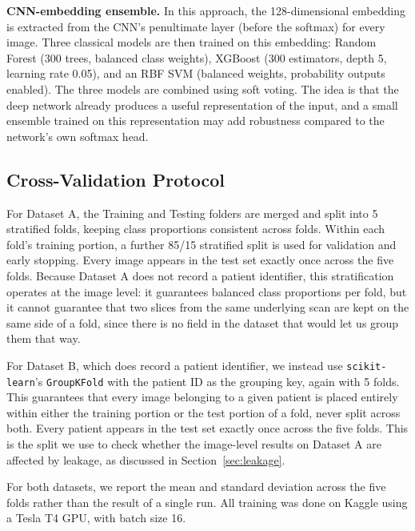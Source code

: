 \documentclass[conference]{IEEEtran}
\begin{document}
\textbf{CNN-embedding ensemble.} In this approach, the 128-dimensional embedding is extracted from the CNN's penultimate layer (before the softmax) for every image. Three classical models are then trained on this embedding: Random Forest \cite{breiman2001randomforests} (300 trees, balanced class weights), XGBoost \cite{chen2016xgboost} (300 estimators, depth 5, learning rate 0.05), and an RBF SVM (balanced weights, probability outputs enabled). The three models are combined using soft voting. The idea is that the deep network already produces a useful representation of the input, and a small ensemble trained on this representation may add robustness compared to the network's own softmax head.

\subsection{Cross-Validation Protocol}
\label{sec:cv_protocol}
For Dataset A, the Training and Testing folders are merged and split into 5 stratified folds, keeping class proportions consistent across folds. Within each fold's training portion, a further 85/15 stratified split is used for validation and early stopping. Every image appears in the test set exactly once across the five folds. Because Dataset A does not record a patient identifier, this stratification operates at the image level: it guarantees balanced class proportions per fold, but it cannot guarantee that two slices from the same underlying scan are kept on the same side of a fold, since there is no field in the dataset that would let us group them that way.

For Dataset B, which does record a patient identifier, we instead use \texttt{scikit-learn}'s \texttt{GroupKFold} \cite{pedregosa2011scikitlearn} with the patient ID as the grouping key, again with 5 folds. This guarantees that every image belonging to a given patient is placed entirely within either the training portion or the test portion of a fold, never split across both. Every patient appears in the test set exactly once across the five folds. This is the split we use to check whether the image-level results on Dataset A are affected by leakage, as discussed in Section~\ref{sec:leakage}.

For both datasets, we report the mean and standard deviation across the five folds rather than the result of a single run. All training was done on Kaggle using a Tesla T4 GPU, with batch size 16.
\end{document}
